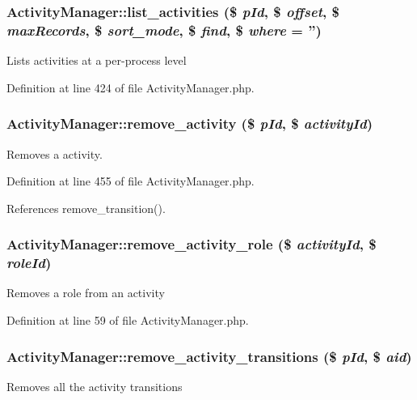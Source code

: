 \subsubsection{\setlength{\rightskip}{0pt plus 5cm}Activity\-Manager::list\_\-activities (\$ {\em p\-Id}, \$ {\em offset}, \$ {\em max\-Records}, \$ {\em sort\_\-mode}, \$ {\em find}, \$ {\em where} = '')}\label{classActivityManager_a17}


Lists activities at a per-process level 

Definition at line 424 of file Activity\-Manager.php.
\subsubsection{\setlength{\rightskip}{0pt plus 5cm}Activity\-Manager::remove\_\-activity (\$ {\em p\-Id}, \$ {\em activity\-Id})}\label{classActivityManager_a18}


Removes a activity. 

Definition at line 455 of file Activity\-Manager.php.

References remove\_\-transition().
\subsubsection{\setlength{\rightskip}{0pt plus 5cm}Activity\-Manager::remove\_\-activity\_\-role (\$ {\em activity\-Id}, \$ {\em role\-Id})}\label{classActivityManager_a4}


Removes a role from an activity 

Definition at line 59 of file Activity\-Manager.php.
\subsubsection{\setlength{\rightskip}{0pt plus 5cm}Activity\-Manager::remove\_\-activity\_\-transitions (\$ {\em p\-Id}, \$ {\em aid})}\label{classActivityManager_a8}


Removes all the activity transitions 

